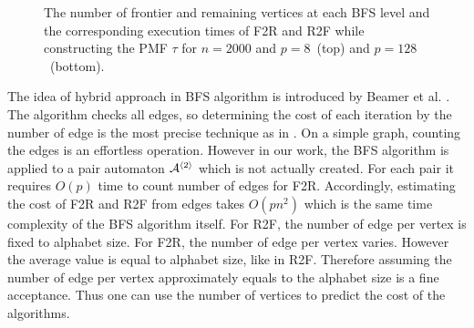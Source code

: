 \documentclass[12pt]{article}
\newcommand{\comment}[2]{{\color{red}{\bf (#1: #2)}}}
\begin{document}
\begin{figure}[ht]
{	}
	\caption{The number of frontier and remaining vertices at each BFS level and the corresponding execution times of F2R and R2F while constructing the PMF $\tau$ for $n = 2000$ and $p = 8$~(top) and $p=128$~(bottom). 
\comment{sertac}{sayilardaki virguller nokta olmali.}}%
	
	\label{fig:BFS-vtcomparison}
\end{figure}

The idea of hybrid approach in BFS algorithm is introduced by Beamer et al. \cite{Beamer}. The algorithm checks all edges, so determining the cost of each iteration by the number of edge is the most precise technique as in \cite{Beamer}. On a simple graph, counting the edges is an effortless operation. However in our work, the BFS algorithm is applied to a pair automaton ${\cal A}^{\langle 2 \rangle}$ which is not actually created. For each pair it requires $O(p)$ time to count number of edges for F2R. Accordingly, estimating the cost of F2R and R2F from edges takes $O(pn^2)$ which is the same time complexity of the BFS algorithm itself. For R2F, the number of edge per vertex is fixed to alphabet size. For F2R, the number of edge per vertex varies. However the average value is equal to alphabet size, like in R2F. Therefore assuming the number of edge per vertex approximately equals to the alphabet size is a fine acceptance. Thus one can use the number of vertices to predict the cost of the algorithms.
\end{document}
